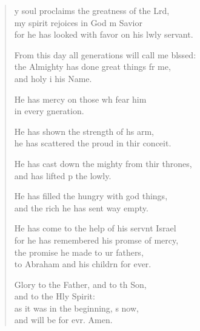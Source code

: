 \begin{verse}
  \begin{patverse}
y soul proclaims the greatness of the Lrd,\Flex\\
my spirit rejoices in God m Savior\Med\\
for he has looked with favor on his lwly servant.

From this day all generations will call me blssed:\Flex\\
the Almighty has done great things fr me,\Med\\
and holy i his Name.

He has mercy on those wh fear him\Med\\
in every gneration.

He has shown the strength of h\pointup{\i}s arm,\Med\\
he has scattered the proud in thir conceit.

He has cast down the mighty from thir thrones,\Med\\
and has lifted p the lowly.

He has filled the hungry with god things,\Med\\
and the rich he has sent way empty.

He has come to the help of his servnt Israel\Med\\
for he has remembered his promse of mercy,\\
the promise he made to ur fathers,\Med\\
to Abraham and his childrn for ever.

Glory to the Father, and to th Son,\Med\\
and to the Hly Spirit:\\
as it was in the beginning, \pointup{\i}s now,\Med\\
and will be for evr. Amen.
  \end{patverse}
\end{verse}
